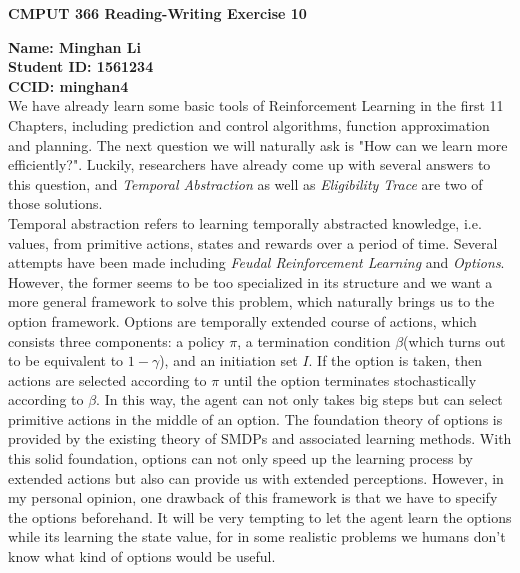 \documentclass[12pt,a4paper]{article}
\begin{document}
\centerline{\large{\textbf{CMPUT 366 Reading-Writing Exercise 10}}}
\noindent \textbf{Name: Minghan Li}\\
\textbf{Student ID: 1561234}\\
\textbf{CCID: minghan4}\\

We have already learn some basic tools of Reinforcement Learning in the first 11 Chapters, including prediction and control algorithms, function approximation and planning. The next question we will naturally ask is "How can we learn more efficiently?". Luckily, researchers have already come up with several answers to this question, and \textit{Temporal Abstraction} as well as \textit{Eligibility Trace} are two of those solutions.\\

Temporal abstraction refers to learning temporally abstracted knowledge, i.e. values, from primitive actions, states and rewards over a period of time. Several attempts have been made including \textit{Feudal Reinforcement Learning} and \textit{Options}. However, the former seems to be too specialized in its structure and we want a more general framework to solve this problem, which naturally brings us to the option framework. Options are temporally extended course of actions, which consists three components: a
policy $\pi$, a termination condition $\beta$(which turns out to be equivalent to $1-\gamma$), and an initiation set $I$. If the option is
taken, then actions are selected according to $\pi$ until the option terminates stochastically
according to $\beta$. In this way, the agent can not only takes big steps but can select primitive actions in the middle of an option. The foundation theory of options is provided by the existing theory of SMDPs and associated learning methods. With this solid foundation, options can not only speed up the learning process by extended actions but also can provide us with extended perceptions. However, in my personal opinion, one drawback of this framework
is that we have to specify the options beforehand. It will be very tempting to let the agent learn the options while its learning the state value, for in some realistic problems we humans don't know what kind of options would be useful.\\
\end{document}

